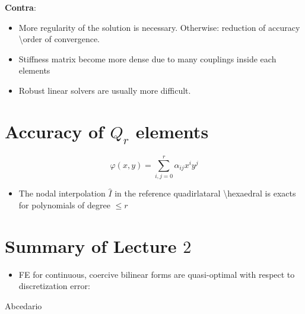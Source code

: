 \documentclass[openany,a4paper,11pt]{memoir}
\theoremstyle{definition}
\begin{document}
\textbf{Contra}:
\begin{itemize}
\item More regularity of the solution is necessary. Otherwise: reduction of accuracy \textbackslash order of convergence.
  
\item Stiffness matrix become more dense due to many couplings inside each elements

  
\item Robust linear solvers are usually more difficult.
\end{itemize}

\section{Accuracy of $Q_r$ elements}

\[ \varphi(x,y)=\sum_{i,j=0}^{r}\alpha_{ij}x^iy^j \]
\begin{itemize}
\item The nodal interpolation $\hat{I}$ in the reference quadirlataral \textbackslash hexaedral is exacts for polynomials of degree $\le r$
\end{itemize}

\section{Summary of Lecture $2$}

\begin{itemize}
\item FE for continuous, coercive bilinear forms are quasi-optimal with respect to discretization error:
\end{itemize}

Abcedario
\end{document}
